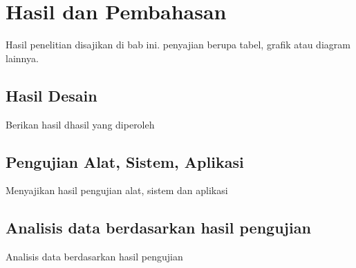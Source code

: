 \chapter{Hasil dan Pembahasan}
\label{chap: hasilpembahasan}

Hasil penelitian disajikan di bab ini. penyajian berupa tabel, grafik atau diagram lainnya.

\section{Hasil Desain}
\label{sec: hasildesain}
Berikan hasil dhasil yang diperoleh

\section{Pengujian Alat, Sistem, Aplikasi}
\label{sec:pengujianalat}
Menyajikan hasil pengujian alat, sistem dan aplikasi


\section{Analisis data berdasarkan hasil pengujian}
\label{sec:analisis}

Analisis data berdasarkan hasil pengujian

